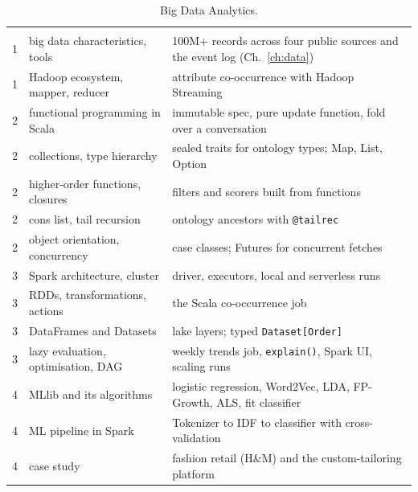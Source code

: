 \begin{table}[h]
\centering\small
\caption{Big Data Analytics.}
\begin{tabularx}{\textwidth}{@{}P{1.2cm}P{4.6cm}L@{}}
 &  & \\
1 & big data characteristics, tools & 100M+ records across four public sources and the event log (Ch.~\ref{ch:data})\\
1 & Hadoop ecosystem, mapper, reducer & attribute co-occurrence with Hadoop Streaming\\
2 & functional programming in Scala & immutable spec, pure update function, fold over a conversation\\
2 & collections, type hierarchy & sealed traits for ontology types; Map, List, Option\\
2 & higher-order functions, closures & filters and scorers built from functions\\
2 & cons list, tail recursion & ontology ancestors with \texttt{@tailrec}\\
2 & object orientation, concurrency & case classes; Futures for concurrent fetches\\
3 & Spark architecture, cluster & driver, executors, local and serverless runs\\
3 & RDDs, transformations, actions & the Scala co-occurrence job\\
3 & DataFrames and Datasets & lake layers; typed \texttt{Dataset[Order]}\\
3 & lazy evaluation, optimisation, DAG & weekly trends job, \texttt{explain()}, Spark UI, scaling runs\\
4 & MLlib and its algorithms & logistic regression, Word2Vec, LDA, FP-Growth, ALS, fit classifier\\
4 & ML pipeline in Spark & Tokenizer to IDF to classifier with cross-validation\\
4 & case study & fashion retail (H\&M) and the custom-tailoring platform\\
\end{tabularx}
\end{table}
